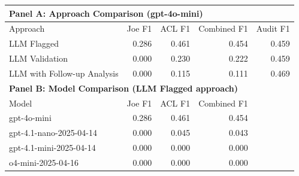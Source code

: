 \begin{tabular}{lrrrr}
\toprule
\multicolumn{5}{l}{\textbf{Panel A: Approach Comparison (gpt-4o-mini)}} \\
\midrule
Approach & Joe F1 & ACL F1 & Combined F1 & Audit F1 \\
\midrule
LLM Flagged & 0.286 & 0.461 & 0.454 & 0.459 \\
LLM Validation & 0.000 & 0.230 & 0.222 & 0.459 \\
LLM with Follow-up Analysis & 0.000 & 0.115 & 0.111 & 0.469 \\
\midrule
\multicolumn{5}{l}{\textbf{Panel B: Model Comparison (LLM Flagged approach)}} \\
\midrule
Model & Joe F1 & ACL F1 & Combined F1 & \\
\midrule
gpt-4o-mini & 0.286 & 0.461 & 0.454 & \\
gpt-4.1-nano-2025-04-14 & 0.000 & 0.045 & 0.043 & \\
gpt-4.1-mini-2025-04-14 & 0.000 & 0.000 & 0.000 & \\
o4-mini-2025-04-16 & 0.000 & 0.000 & 0.000 & \\
\bottomrule
\end{tabular}
